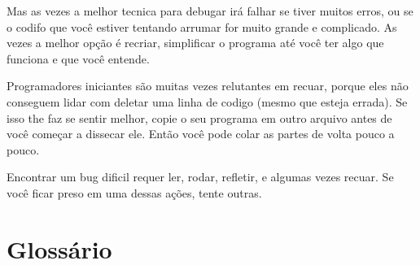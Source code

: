 Mas as vezes a melhor tecnica para debugar irá falhar se tiver muitos
erros, ou se o codifo que você estiver tentando arrumar for muito grande
e complicado. As vezes a melhor opção é recriar, simplificar o programa
até você ter algo que funciona e que você entende.

Programadores iniciantes são muitas vezes relutantes em recuar, porque
eles não conseguem lidar com deletar uma linha de codigo (mesmo que
esteja errada). Se isso the faz se sentir melhor, copie o seu programa
em outro arquivo antes de você começar a dissecar ele. Então você pode
colar as partes de volta pouco a pouco.

Encontrar um bug dificil requer ler, rodar, refletir, e algumas vezes
recuar. Se você ficar preso em uma dessas ações, tente outras.


\section{Glossário}

